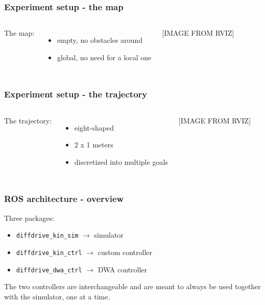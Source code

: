 \documentclass{beamer}
\begin{document}
\begin{frame}
\frametitle{Experiment setup - the map}

\begin{columns}


The map:
\begin{itemize}
  \item empty, no obstacles around
  \item global, no need for a local one
\end{itemize}



[IMAGE FROM RVIZ]

\end{columns}

\end{frame}


\begin{frame}
\frametitle{Experiment setup - the trajectory}

\begin{columns}


The trajectory:
\begin{itemize}
  \item eight-shaped
  \item 2 x 1 meters
  \item discretized into multiple goals
\end{itemize}



[IMAGE FROM RVIZ]

\end{columns}

\end{frame}


\begin{frame}
\frametitle{ROS architecture - overview}

Three packages:
\begin{itemize}
  \item \texttt{diffdrive\_kin\_sim} $\rightarrow$ simulator
  \item \texttt{diffdrive\_kin\_ctrl} $\rightarrow$ custom controller
  \item \texttt{diffdrive\_dwa\_ctrl} $\rightarrow$ DWA controller
\end{itemize}

\vspace{2em}

The two controllers are interchangeable and are meant to always be used together
with the simulator, one at a time.

\end{frame}
\end{document}
